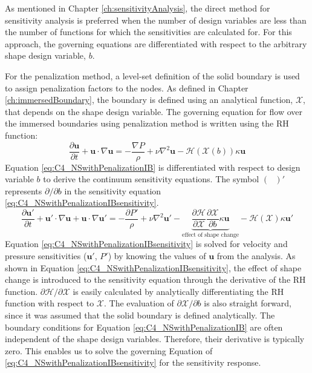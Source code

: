 As mentioned in Chapter \ref{ch:sensitivityAnalysis}, the direct method for sensitivity analysis is preferred when the number of design variables are less than the number of functions for which the sensitivities are calculated for. For this approach, the governing equations are differentiated with respect to the arbitrary shape design variable, $b$.

For the penalization method, a level-set definition of the solid boundary is used to assign penalization factors to the nodes. As defined in Chapter \ref{ch:immersedBoundary}, the boundary is defined using an analytical function, $\mathcal{X}$, that depends on the shape design variable. The governing equation for flow over the immersed boundaries using penalization method is written using the RH function:
%
\begin{equation}\label{eq:C4_NSwithPenalizationIB}
    \frac{\partial \mathbf{u}}{\partial t} + \mathbf{u} \cdot \nabla \mathbf{u} = 
    -\frac{\nabla P}{\rho} + \nu \nabla^2 \mathbf{u} -\mathcal{H}(\mathcal{X}(b)) \kappa \mathbf{u}
\end{equation}
%
Equation \eqref{eq:C4_NSwithPenalizationIB} is differentiated with respect to design variable $b$ to derive the continuum sensitivity equations. The symbol $(\text{ })'$ represents $\partial /\partial b$ in the sensitivity equation \eqref{eq:C4_NSwithPenalizationIBsensitivity}.
%
\begin{equation}\label{eq:C4_NSwithPenalizationIBsensitivity}
    \frac{\partial \mathbf{u}'}{\partial t} +
    \mathbf{u}' \cdot \nabla \mathbf{u} + \mathbf{u} \cdot \nabla \mathbf{u}' = 
    -\frac{\partial P'}{\rho} + 
    \nu \nabla^2 \mathbf{u}' - 
    \underbrace{\frac{\partial \mathcal{H}}{\partial \mathcal{X}} \frac{\partial \mathcal{X}}{\partial b} \kappa \mathbf{u}}_\text{effect of shape change} - 
    \mathcal{H}(\mathcal{X}) \kappa \mathbf{u}'
\end{equation}
%
Equation \eqref{eq:C4_NSwithPenalizationIBsensitivity} is solved for velocity and pressure sensitivities ($\mathbf{u}'$, $P'$) by knowing the values of $\mathbf{u}$ from the analysis. As shown in Equation \eqref{eq:C4_NSwithPenalizationIBsensitivity}, the effect of shape change is introduced to the sensitivity equation through the derivative of the RH function. $\partial \mathcal{H}/\partial \mathcal{X}$ is easily calculated by analytically differentiating the RH function with respect to $\mathcal{X}$. The evaluation of $\partial \mathcal{X}/\partial b$ is also straight forward, since it was assumed that the solid boundary is defined analytically. The boundary conditions for Equation \eqref{eq:C4_NSwithPenalizationIB} are often independent of the shape design variables. Therefore, their derivative is typically zero. This enables us to solve the governing Equation of \eqref{eq:C4_NSwithPenalizationIBsensitivity} for the sensitivity response.

